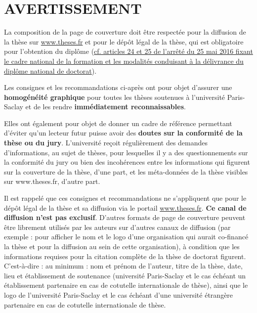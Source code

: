 \documentclass[french,12pt,a4paper]{book}
\begin{document}
\chapter{AVERTISSEMENT}
La composition de la page de couverture doit être respectée pour la diffusion de la thèse sur \url{www.theses.fr} et pour le dépôt légal de la thèse, qui est obligatoire pour l’obtention du diplôme (\href{https://www.legifrance.gouv.fr/affichTexte.do?cidTexte=JORFTEXT000032587086&dateTexte=20160902}{cf. articles 24 et 25 de l’arrêté du 25 mai 2016 fixant le cadre national de la formation et les modalités conduisant à la délivrance du diplôme national de doctorat}).\\ \par
Les consignes et les recommandations ci-après ont pour objet d’assurer une \textbf{homogénéité graphique} pour toutes les thèses soutenues à l’université Paris-Saclay et de les rendre \textbf{immédiatement reconnaissables}.\\ \par
Elles ont également pour objet de donner un cadre de référence permettant d’éviter qu’un lecteur futur puisse avoir des \textbf{doutes sur la conformité de la thèse ou du jury}. L’université reçoit régulièrement des demandes d’informations, au sujet de thèses, pour lesquelles il y a des questionnements sur la conformité du jury ou bien des incohérences entre les informations qui figurent sur la couverture de la thèse, d’une part, et les méta-données de la thèse visibles sur www.theses.fr, d’autre part.\\ \par
Il est rappelé que ces consignes et recommandations ne s’appliquent que pour le dépôt légal de la thèse et sa diffusion via le portail \url{www.theses.fr}. \textbf{Ce canal de diffusion n’est pas exclusif}. D’autres formats de page de couverture peuvent être librement utilisés par les auteurs sur d’autres canaux de diffusion (par exemple : pour afficher le nom et le logo d’une organisation qui aurait co-financé la thèse et pour la diffusion au sein de cette organisation), à condition que les informations requises pour la citation complète de la thèse de doctorat figurent. C’est-à-dire : au minimum : nom et prénom de l’auteur, titre de la thèse, date, lieu et établissement de soutenance (université Paris-Saclay et le cas échéant un établissement partenaire en cas de cotutelle internationale de thèse), ainsi que le logo de l’université Paris-Saclay et le cas échéant d’une université étrangère partenaire en cas de cotutelle internationale de thèse.
\end{document}
